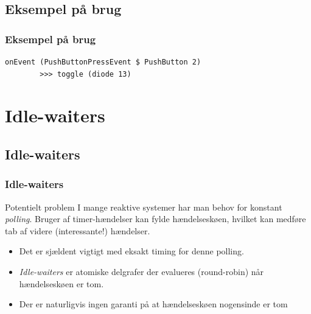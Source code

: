 \documentclass{beamer}
\begin{document}
\subsection{Eksempel på brug}
\begin{frame}[fragile]
\frametitle{Eksempel på brug}

\begin{verbatim}
onEvent (PushButtonPressEvent $ PushButton 2) 
        >>> toggle (diode 13)
\end{verbatim}
\normalsize

\end{frame}

\section{Idle-waiters}
\subsection{Idle-waiters}
\begin{frame}
\frametitle{Idle-waiters}

\begin{block}{Potentielt problem}
  I mange reaktive systemer har man behov for konstant
  \textit{polling}.  Bruger af timer-hændelser kan fylde
  hændelseskøen, hvilket kan medføre tab af videre (interessante!)
  hændelser.
\end{block}

\pause

\begin{itemize}
\item Det er sjældent vigtigt med eksakt timing for denne polling.
\item \textit{Idle-waiters} er atomiske delgrafer der evalueres
  (round-robin) når hændelseskøen er tom.
\item Der er naturligvis ingen garanti på at hændelseskøen nogensinde
  er tom
\end{itemize}

\end{frame}
\end{document}
